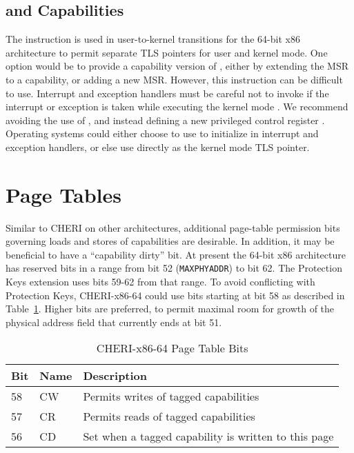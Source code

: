 \subsection{ and Capabilities}

The  instruction is used in user-to-kernel
transitions for the 64-bit x86 architecture to permit separate TLS
pointers for user and kernel mode.  One option would be to provide a
capability version of , either by extending the
\KGSBASE{} MSR to a capability, or adding a new MSR.  However, this
instruction can be difficult to use.  Interrupt and exception handlers
must be careful not to invoke  if the interrupt
or exception is taken while executing the kernel mode \GS{}.  We
recommend avoiding the use of , and instead defining
a new privileged control register \KGS{}.  Operating systems could
either choose to use \KGS{} to initialize \CGS{} in interrupt and
exception handlers, or else use \KGS{} directly as the kernel mode TLS
pointer.

\section{Page Tables}

Similar to CHERI on other architectures, additional page-table
permission bits governing loads and stores of capabilities are
desirable.  In addition, it may be beneficial to have a ``capability
dirty'' bit.  At present the 64-bit x86 architecture has reserved bits
in a range from bit 52 (\texttt{MAXPHYADDR}) to bit 62.  The Protection Keys
extension uses bits 59-62 from that range.  To avoid conflicting with
Protection Keys, CHERI-x86-64 could use bits starting at bit 58 as described in Table~\ref{table:x86:pte}.  Higher bits are
preferred, to permit maximal room for growth of the physical address
field that currently ends at bit 51.

\begin{table}
\begin{center}
\begin{tabular}{lll}
\toprule
Bit & Name & Description \\
\midrule
58 & CW & Permits writes of tagged capabilities \\
57 & CR & Permits reads of tagged capabilities \\
56 & CD & Set when a tagged capability is written to this page \\
\bottomrule
\end{tabular}
\end{center}
\caption{CHERI-x86-64 Page Table Bits}
\label{table:x86:pte}
\end{table}

